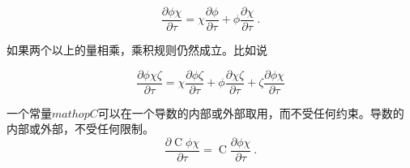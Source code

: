\documentclass[LBMDerivation.tex]{subfiles}
\begin{document}
%
%
\begin{equation}
 \frac{\partial \phi \chi}{\partial \tau}
 =
 \chi \frac{\partial \phi }{\partial \tau}
+
 \phi \frac{\partial \chi}{\partial \tau}
 \label{EQUATION::productRuleCartesian} ~.
\end{equation}
%
%

如果两个以上的量相乘，乘积规则仍然成立。比如说

%
%
\begin{equation}
 \frac{\partial \phi \chi \zeta}{\partial \tau}
 =
 \chi \frac{\partial \phi\zeta }{\partial \tau}
+
 \phi \frac{\partial \chi\zeta}{\partial \tau}
+
 \zeta \frac{\partial \phi \chi}{\partial \tau}
\end{equation}
%
%

	一个常量$mathop{C}$可以在一个导数的内部或外部取用，而不受任何约束。导数的内部或外部，不受任何限制。
%
%
\begin{equation}
 \frac{\partial \mathop{C} \phi \chi}{\partial \tau}
=
 \mathop{C} \frac{\partial \phi \chi}{\partial \tau} ~.
\end{equation}
%
%
%
%
%
\end{document}
